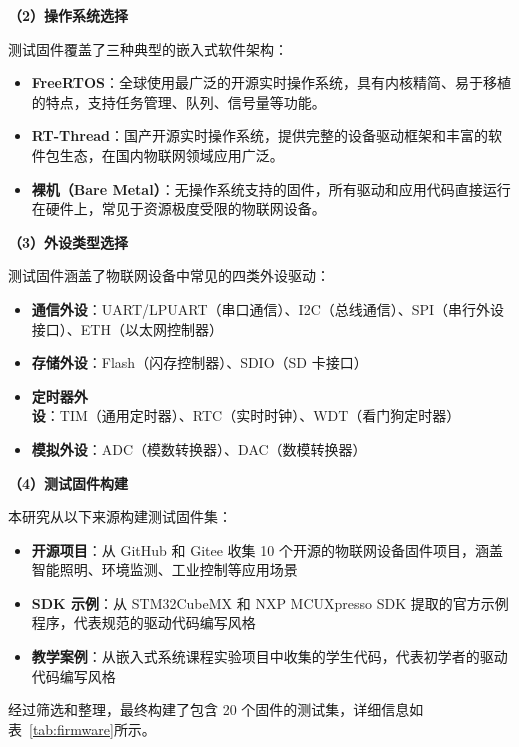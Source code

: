 \textbf{（2）操作系统选择}

测试固件覆盖了三种典型的嵌入式软件架构：

\begin{itemize}
    \item \textbf{FreeRTOS}：全球使用最广泛的开源实时操作系统，具有内核精简、易于移植的特点，支持任务管理、队列、信号量等功能。
    \item \textbf{RT-Thread}：国产开源实时操作系统，提供完整的设备驱动框架和丰富的软件包生态，在国内物联网领域应用广泛。
    \item \textbf{裸机（Bare Metal）}：无操作系统支持的固件，所有驱动和应用代码直接运行在硬件上，常见于资源极度受限的物联网设备。
\end{itemize}

\textbf{（3）外设类型选择}

测试固件涵盖了物联网设备中常见的四类外设驱动：

\begin{itemize}
    \item \textbf{通信外设}：UART/LPUART（串口通信）、I2C（总线通信）、SPI（串行外设接口）、ETH（以太网控制器）
    \item \textbf{存储外设}：Flash（闪存控制器）、SDIO（SD 卡接口）
    \item \textbf{定时器外设}：TIM（通用定时器）、RTC（实时时钟）、WDT（看门狗定时器）
    \item \textbf{模拟外设}：ADC（模数转换器）、DAC（数模转换器）
\end{itemize}

\textbf{（4）测试固件构建}

本研究从以下来源构建测试固件集：

\begin{itemize}
    \item \textbf{开源项目}：从 GitHub 和 Gitee 收集 10 个开源的物联网设备固件项目，涵盖智能照明、环境监测、工业控制等应用场景
    \item \textbf{SDK 示例}：从 STM32CubeMX 和 NXP MCUXpresso SDK 提取的官方示例程序，代表规范的驱动代码编写风格
    \item \textbf{教学案例}：从嵌入式系统课程实验项目中收集的学生代码，代表初学者的驱动代码编写风格
\end{itemize}

经过筛选和整理，最终构建了包含 20 个固件的测试集，详细信息如表~\ref{tab:firmware}所示。


